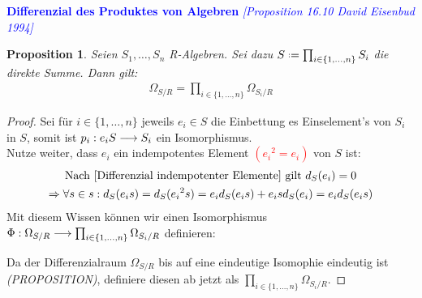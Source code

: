 \documentclass[10pt,a4paper]{report}
\newcommand{\comment}[1]{}
\newcommand{\ModulsOfDifferenzials}{David Eisenbud 1994}
\newcounter{Aussage}[chapter]
\newtheorem{prop}[Aussage]{Proposition}
\newcommand{\functionfront}[3]{\nolinebreak{#1:#2 \longrightarrow #3}}
\newcommand{\divR}[2]{\Omega_{#1/#2}}
\newcommand{\divf}[1]{d_{#1}}
\newcommand*{\defeq}{\mathrel{\vcenter{\baselineskip0.5ex \lineskiplimit0pt
                     \hbox{\scriptsize.}\hbox{\scriptsize.}}}%
                     =}
\begin{document}
\textcolor{blue}{\textbf{Differenzial des Produktes von Algebren} \textit{[Proposition 16.10 \ModulsOfDifferenzials]}}
\begin{prop}\label{Differenzial des Produktes von Algebren}
Seien $S_1, \dots , S_n$ R-Algebren. Sei dazu $S \defeq \prod_{i \in \lbrace 1, \dots , n \rbrace} S_i$ die direkte Summe.
Dann gilt:
\begin{gather*}
\divR{S}{R} = \prod_{i \in \lbrace 1, \dots , n \rbrace} \divR{S_i}{R}
\end{gather*}
\end{prop}
\begin{proof}
Sei für $i \in \lbrace 1, \dots ,n \rbrace$ jeweils $e_i \in S$ die Einbettung es Einselement's von $S_i$ in $S$, somit ist $\functionfront{p_i}{e_iS}{S_i}$ ein Isomorphismus.\\
Nutze weiter, dass $e_i$ ein indempotentes Element \textcolor{red}{$({e_i}^2 = e_i)$} von $S$ ist:
\begin{gather*}
\text{Nach \cref{Differenzial indempotenter Elemente} gilt } \divf{S}(e_i) = 0 \\
\Rightarrow \forall s \in s : \divf{S}(e_is)= \divf{S}({e_i}^2s) = e_i\divf{S}(e_is) + e_is\divf{S}(e_i) = e_i\divf{S}(e_is) \\
\end{gather*}
Mit diesem Wissen können wir einen Isomorphismus $\functionfront{\Phi}{\divR{S}{R}}{\prod_{i \in \lbrace 1, \dots , n \rbrace} \divR{S_i}{R}}$ definieren:
\begin{center}
\end{center}
Da der Differenzialraum $\divR{S}{R}$ bis auf eine eindeutige Isomophie eindeutig ist \textit{(PROPOSITION)},\comment{\label{*Differenzial ist eindeutig}} definiere diesen ab jetzt als $\prod_{i \in \lbrace 1, \dots , n \rbrace} \divR{S_i}{R}$.
\end{proof}
\end{document}
